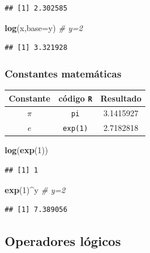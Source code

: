 \documentclass[
]{book}
\newenvironment{Shaded}{\begin{snugshade}}{\end{snugshade}}
\newcommand{\CommentTok}[1]{\textcolor[rgb]{0.56,0.35,0.01}{\textit{#1}}}
\newcommand{\DataTypeTok}[1]{\textcolor[rgb]{0.13,0.29,0.53}{#1}}
\newcommand{\DecValTok}[1]{\textcolor[rgb]{0.00,0.00,0.81}{#1}}
\newcommand{\KeywordTok}[1]{\textcolor[rgb]{0.13,0.29,0.53}{\textbf{#1}}}
\newcommand{\NormalTok}[1]{#1}
\newcommand{\OperatorTok}[1]{\textcolor[rgb]{0.81,0.36,0.00}{\textbf{#1}}}
\theoremstyle{definition}
\theoremstyle{definition}
\theoremstyle{definition}
\theoremstyle{remark}
\begin{document}
\begin{verbatim}
## [1] 2.302585
\end{verbatim}

\begin{Shaded}
\begin{Highlighting}[]
\KeywordTok{log}\NormalTok{(x,}\DataTypeTok{base=}\NormalTok{y) }\CommentTok{# y=2}
\end{Highlighting}
\end{Shaded}

\begin{verbatim}
## [1] 3.321928
\end{verbatim}

\hypertarget{constantes-matemuxe1ticas}{%
\subsubsection{Constantes matemáticas}\label{constantes-matemuxe1ticas}}

\begin{longtable}[]{@{}ccc@{}}
\toprule
Constante & código \texttt{R} & Resultado\tabularnewline
\midrule
\endhead
\(\pi\) & \texttt{pi} & 3.1415927\tabularnewline
\(e\) & \texttt{exp(1)} & 2.7182818\tabularnewline
\bottomrule
\end{longtable}

\begin{Shaded}
\begin{Highlighting}[]
\KeywordTok{log}\NormalTok{(}\KeywordTok{exp}\NormalTok{(}\DecValTok{1}\NormalTok{)) }
\end{Highlighting}
\end{Shaded}

\begin{verbatim}
## [1] 1
\end{verbatim}

\begin{Shaded}
\begin{Highlighting}[]
\KeywordTok{exp}\NormalTok{(}\DecValTok{1}\NormalTok{)}\OperatorTok{^}\NormalTok{y     }\CommentTok{# y=2}
\end{Highlighting}
\end{Shaded}

\begin{verbatim}
## [1] 7.389056
\end{verbatim}

\hypertarget{operadores-luxf3gicos}{%
\subsection{Operadores lógicos}\label{operadores-luxf3gicos}}
\end{document}
